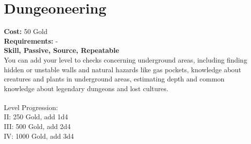 \section*{Dungeoneering}
\textbf{Cost:} 50 Gold\\
\textbf{Requirements:} -\\
\textbf{Skill, Passive, Source, Repeatable}\\
You can add your level to checks concerning underground areas, including finding hidden or unstable walls and natural hazards like gas pockets, knowledge about creatures and plants in underground areas, estimating depth and common knowledge about legendary dungeons and lost cultures.\\
\\
Level Progression:\\
II: 250 Gold, add 1d4\\
III: 500 Gold, add 2d4\\
IV: 1000 Gold, add 3d4\\